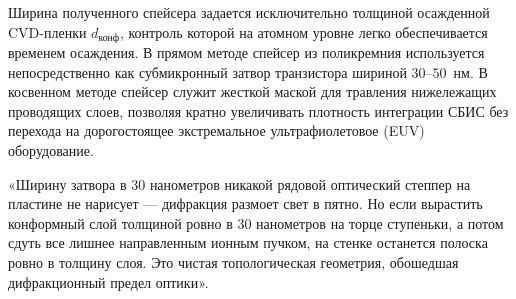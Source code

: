 \documentclass[12pt,a4paper]{article}
\theoremstyle{plain}
\theoremstyle{definition}
\theoremstyle{remark}
\numberwithin{equation}{section}
\begin{document}
Ширина полученного спейсера задается исключительно толщиной осажденной CVD-пленки $d_\text{конф}$, контроль которой на атомном уровне легко обеспечивается временем осаждения. В прямом методе спейсер из поликремния используется непосредственно как субмикронный затвор транзистора шириной $30\text{--}50$~нм. В косвенном методе спейсер служит жесткой маской для травления нижележащих проводящих слоев, позволяя кратно увеличивать плотность интеграции СБИС без перехода на дорогостоящее экстремальное ультрафиолетовое (EUV) оборудование.

«Ширину затвора в $30$ нанометров никакой рядовой оптический степпер на пластине не нарисует — дифракция размоет свет в пятно. Но если вырастить конформный слой толщиной ровно в $30$ нанометров на торце ступеньки, а потом сдуть все лишнее направленным ионным пучком, на стенке останется полоска ровно в толщину слоя. Это чистая топологическая геометрия, обошедшая дифракционный предел оптики».
\end{document}
